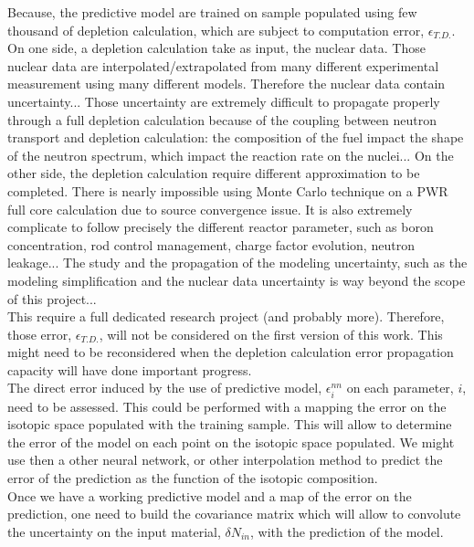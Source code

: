 \documentclass[dvips,12pt]{article}
\begin{document}
Because, the predictive model are trained on sample populated using few thousand of depletion calculation, which are subject to computation error, $\epsilon_{T.D.}$. On one side, a depletion calculation take as input, the nuclear data. Those nuclear data are interpolated/extrapolated from many different experimental measurement using many different models. Therefore the nuclear data contain uncertainty...
Those uncertainty are extremely difficult to propagate properly through a full depletion calculation because of the coupling between neutron transport and depletion calculation: the composition of the fuel impact the shape of the neutron spectrum, which impact the reaction rate on the nuclei... On the other side, the depletion calculation require different approximation to be completed. There is nearly impossible using Monte Carlo technique on a PWR full core calculation due to source convergence issue. It is also extremely complicate to follow precisely the different reactor parameter, such as boron concentration, rod control management, charge factor evolution, neutron leakage... The study and the propagation of the modeling uncertainty, such as the modeling simplification and the nuclear data uncertainty is way beyond the scope of this project...\\
 This require a full dedicated research project (and probably more). Therefore, those error, $\epsilon_{T.D.}$, will not be considered on the first version of this work. This might need to be reconsidered when the depletion calculation error propagation capacity will have done important progress.\\

The direct error induced by the use of predictive model, $\epsilon^{nn}_{i}$ on each parameter, $i$, need to be assessed. This could be performed with a mapping the error on the isotopic space populated with the training sample. This will allow to determine the error of the model on each point on the isotopic space populated. We might use then a other neural network, or other interpolation method to predict the error of the prediction as the function of the isotopic composition.\\
Once we have a working predictive model and a map of the error on the prediction, one need to build the covariance matrix which will allow to convolute the uncertainty on the input material, $\delta N_{in}$, with the prediction of the model.\\
\end{document}
